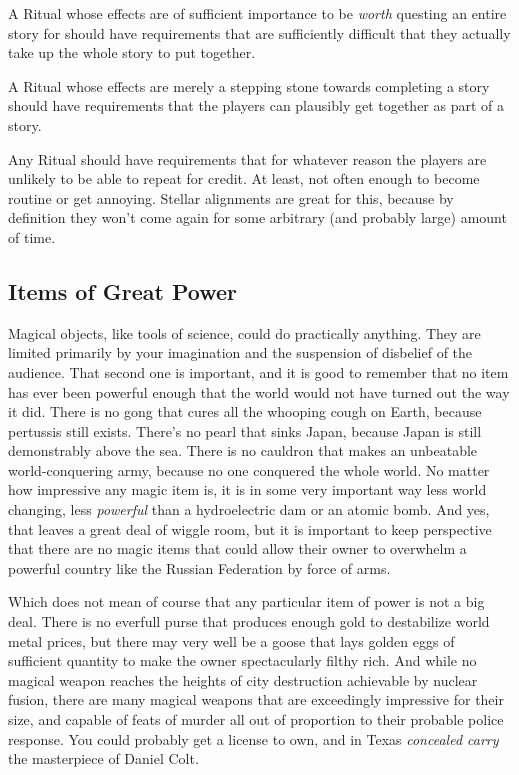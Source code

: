 \begin{itemize*}
\item A Ritual whose effects are of sufficient importance to be \textit{worth} questing an entire story for should have requirements that are sufficiently difficult that they actually take up the whole story to put together.

\item A Ritual whose effects are merely a stepping stone towards completing a story should have requirements that the players can plausibly get together as part of a story.

\item Any Ritual should have requirements that for whatever reason the players are unlikely to be able to repeat for credit. At least, not often enough to become routine or get annoying. Stellar alignments are great for this, because by definition they won't come again for some arbitrary (and probably large) amount of time.
\end{itemize*}

\subsection{Items of Great Power}

Magical objects, like tools of science, could do practically anything. They are limited primarily by your imagination and the suspension of disbelief of the audience. That second one is important, and it is good to remember that no item has ever been powerful enough that the world would not have turned out the way it did. There is no gong that cures all the whooping cough on Earth, because pertussis still exists. There's no pearl that sinks Japan, because Japan is still demonstrably above the sea. There is no cauldron that makes an unbeatable world-conquering army, because no one conquered the whole world. No matter how impressive any magic item is, it is in some very important way less world changing, less \textit{powerful} than a hydroelectric dam or an atomic bomb. And yes, that leaves a great deal of wiggle room, but it is important to keep perspective that there are no magic items that could allow their owner to overwhelm a powerful country like the Russian Federation by force of arms.

Which does not mean of course that any particular item of power is not a big deal. There is no everfull purse that produces enough gold to destabilize world metal prices, but there may very well be a goose that lays golden eggs of sufficient quantity to make the owner spectacularly filthy rich. And while no magical weapon reaches the heights of city destruction achievable by nuclear fusion, there are many magical weapons that are exceedingly impressive for their size, and capable of feats of murder all out of proportion to their probable police response. You could probably get a license to own, and in Texas \textit{concealed carry} the masterpiece of Daniel Colt.

